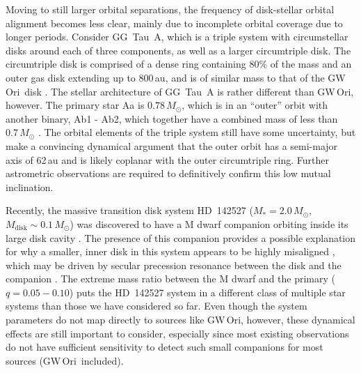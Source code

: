 \documentclass[twocolumn]{aastex61}
\newcommand{\obj}{GW\,Ori}
\begin{document}
Moving to still larger orbital separations, the frequency of disk-stellar orbital alignment becomes less clear, mainly due to incomplete orbital coverage due to longer periods. Consider GG~Tau~A, which is a triple system with circumstellar disks around each of three components, as well as a larger circumtriple disk. The circumtriple disk is comprised of a dense ring containing 80\% of the mass and an outer gas disk extending up to 800\,au, and is of similar mass to that of the \obj\ disk \citep[$0.12\,M_\odot$;][]{guilloteau99}. The stellar architecture of GG~Tau~A is rather different than \obj, however. The primary star Aa is $0.78\,M_\odot$, which is in an ``outer'' orbit with another binary, Ab1 - Ab2, which together have a combined mass of less than $0.7\,M_\odot$ \citep{dutrey16}. The orbital elements of the triple system still have some uncertainty, but \citet{nelson16} make a convincing dynamical argument that the outer orbit has a semi-major axis of 62\,au and is likely coplanar with the outer circumtriple ring. Further astrometric observations are required to definitively confirm this low mutual inclination.

Recently, the massive transition disk system HD~142527 ($M_\ast = 2.0\,M_\odot$, $M_\mathrm{disk} \sim 0.1\,M_\odot$) was discovered to have a M dwarf companion orbiting inside its large disk cavity \citep{biller12,lacour16}. The presence of this companion provides a possible explanation for why a smaller, inner disk in this system appears to be highly misaligned \citep[$\sim 70^\circ$][]{avenhaus14,marino15}, which may be driven by secular precession resonance between the disk and the companion \citep{owen17}.
The extreme mass ratio between the M dwarf and the primary ($q = 0.05 - 0.10$) puts the HD~142527 system in a different class of multiple star systems than those we have considered so far. Even though the system parameters do not map directly to sources like \obj, however, these dynamical effects are still important to consider, especially since most existing observations do not have sufficient sensitivity to detect such small companions for most sources (\obj\ included).
\end{document}
